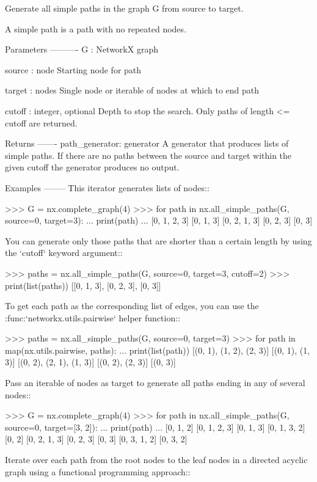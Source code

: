 \begin{DoxyVerb}Generate all simple paths in the graph G from source to target.

A simple path is a path with no repeated nodes.

Parameters
----------
G : NetworkX graph

source : node
   Starting node for path

target : nodes
   Single node or iterable of nodes at which to end path

cutoff : integer, optional
    Depth to stop the search. Only paths of length <= cutoff are returned.

Returns
-------
path_generator: generator
   A generator that produces lists of simple paths.  If there are no paths
   between the source and target within the given cutoff the generator
   produces no output.

Examples
--------
This iterator generates lists of nodes::

    >>> G = nx.complete_graph(4)
    >>> for path in nx.all_simple_paths(G, source=0, target=3):
    ...     print(path)
    ...
    [0, 1, 2, 3]
    [0, 1, 3]
    [0, 2, 1, 3]
    [0, 2, 3]
    [0, 3]

You can generate only those paths that are shorter than a certain
length by using the `cutoff` keyword argument::

    >>> paths = nx.all_simple_paths(G, source=0, target=3, cutoff=2)
    >>> print(list(paths))
    [[0, 1, 3], [0, 2, 3], [0, 3]]

To get each path as the corresponding list of edges, you can use the
:func:`networkx.utils.pairwise` helper function::

    >>> paths = nx.all_simple_paths(G, source=0, target=3)
    >>> for path in map(nx.utils.pairwise, paths):
    ...     print(list(path))
    [(0, 1), (1, 2), (2, 3)]
    [(0, 1), (1, 3)]
    [(0, 2), (2, 1), (1, 3)]
    [(0, 2), (2, 3)]
    [(0, 3)]

Pass an iterable of nodes as target to generate all paths ending in any of several nodes::

    >>> G = nx.complete_graph(4)
    >>> for path in nx.all_simple_paths(G, source=0, target=[3, 2]):
    ...     print(path)
    ...
    [0, 1, 2]
    [0, 1, 2, 3]
    [0, 1, 3]
    [0, 1, 3, 2]
    [0, 2]
    [0, 2, 1, 3]
    [0, 2, 3]
    [0, 3]
    [0, 3, 1, 2]
    [0, 3, 2]

Iterate over each path from the root nodes to the leaf nodes in a
directed acyclic graph using a functional programming approach::


\end{DoxyVerb}
